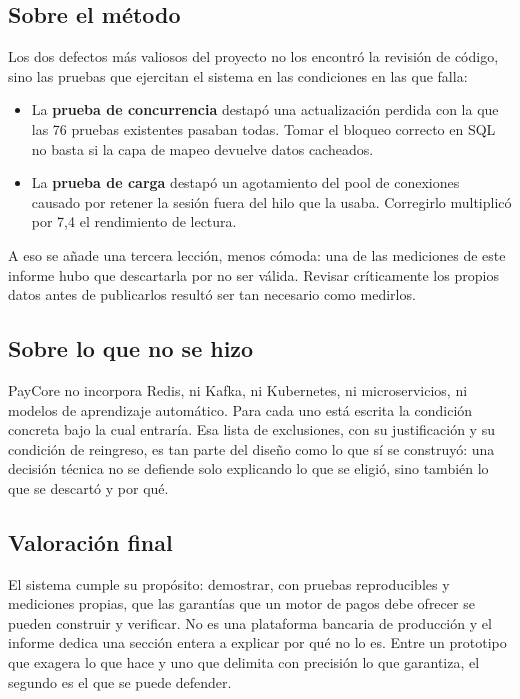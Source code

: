 \subsection{Sobre el método}

Los dos defectos más valiosos del proyecto no los encontró la revisión de
código, sino las pruebas que ejercitan el sistema en las condiciones en las
que falla:

\begin{itemize}[leftmargin=1.2em]
  \item La \textbf{prueba de concurrencia} destapó una actualización perdida
    con la que las 76 pruebas existentes pasaban todas. Tomar el bloqueo
    correcto en SQL no basta si la capa de mapeo devuelve datos cacheados.
  \item La \textbf{prueba de carga} destapó un agotamiento del pool de
    conexiones causado por retener la sesión fuera del hilo que la usaba.
    Corregirlo multiplicó por 7,4 el rendimiento de lectura.
\end{itemize}

A eso se añade una tercera lección, menos cómoda: una de las mediciones de
este informe hubo que descartarla por no ser válida. Revisar críticamente los
propios datos antes de publicarlos resultó ser tan necesario como medirlos.

\subsection{Sobre lo que no se hizo}

PayCore no incorpora Redis, ni Kafka, ni Kubernetes, ni microservicios, ni
modelos de aprendizaje automático. Para cada uno está escrita la condición
concreta bajo la cual entraría. Esa lista de exclusiones, con su justificación
y su condición de reingreso, es tan parte del diseño como lo que sí se
construyó: una decisión técnica no se defiende solo explicando lo que se
eligió, sino también lo que se descartó y por qué.

\subsection{Valoración final}

El sistema cumple su propósito: demostrar, con pruebas reproducibles y
mediciones propias, que las garantías que un motor de pagos debe ofrecer se
pueden construir y verificar. No es una plataforma bancaria de producción y el
informe dedica una sección entera a explicar por qué no lo es. Entre un
prototipo que exagera lo que hace y uno que delimita con precisión lo que
garantiza, el segundo es el que se puede defender.
